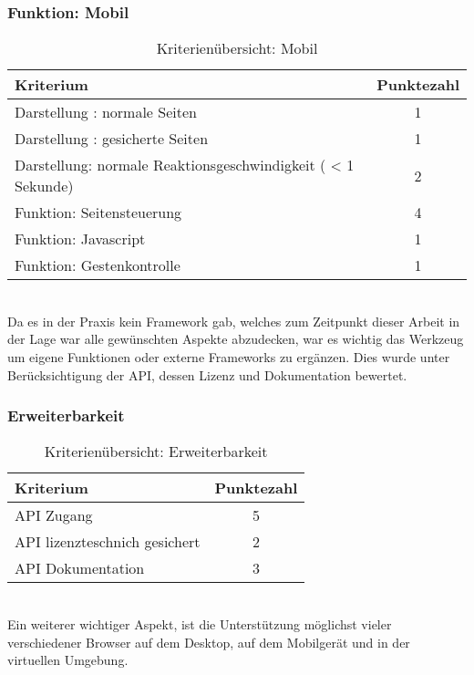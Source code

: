 \subsubsection{Funktion: Mobil}
\begin{table}[H]
 	\vspace{-30pt}
 	\centering
		\begin{tabular}{| p{12cm} | c|}
			\hline
				Kriterium		 &	Punktezahl\\
			\hline
			\hline
				Darstellung : normale Seiten			&1\\
				Darstellung : gesicherte Seiten		&	1	\\
				 Darstellung: normale Reaktionsgeschwindigkeit ( < 1 Sekunde)	&	2	\\
				Funktion: Seitensteuerung			&	4	\\
				Funktion: Javascript			&	1	\\
				Funktion: Gestenkontrolle			&	1	\\
				\hline
		\end{tabular}
	\caption{Kriterienübersicht: Mobil}
\end{table}

\\Da es in der Praxis kein Framework gab, welches zum Zeitpunkt dieser Arbeit in der Lage war alle gewünschten Aspekte abzudecken, war es wichtig das Werkzeug um eigene Funktionen oder externe Frameworks zu ergänzen. Dies wurde unter Berücksichtigung der API, dessen Lizenz und Dokumentation bewertet.
\subsubsection{Erweiterbarkeit}
\begin{table}[H]
 	\vspace{-30pt}
 	\centering
		\begin{tabular}{| p{12cm} | c|}
			\hline
				Kriterium		 &	Punktezahl\\
			\hline
			\hline
				API Zugang			&5\\
				API lizenzteschnich gesichert	&	2	\\
				API Dokumentation	&	3	\\
				\hline
		\end{tabular}
	\caption{Kriterienübersicht: Erweiterbarkeit}
\end{table}

\\Ein weiterer wichtiger Aspekt, ist die Unterstützung möglichst vieler verschiedener Browser auf dem Desktop, auf dem Mobilgerät und in der virtuellen Umgebung.

